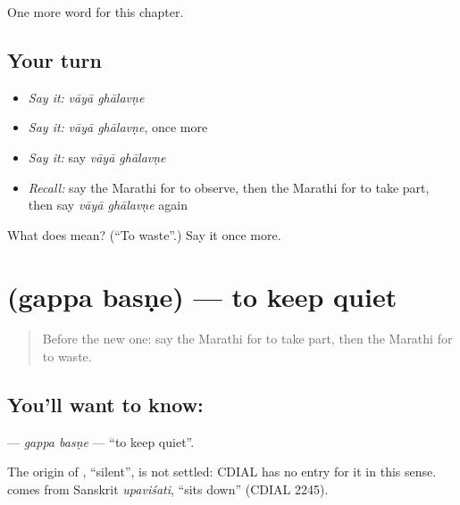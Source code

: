 \begin{grammarlens}[title={What you've built}]
One more word for this chapter.
\end{grammarlens}

\subsection*{Your turn}
\begin{itemize}
\raggedright
  \item \emph{Say it:} \emph{vāyā ghālavṇe}
  \item \emph{Say it:} \emph{vāyā ghālavṇe}, once more
  \item \emph{Say it:} say \emph{vāyā ghālavṇe}
  \item \emph{Recall:} say the Marathi for to observe, then the Marathi for to take part, then say \emph{vāyā ghālavṇe} again
\end{itemize}

\begin{tcolorbox}[breakable,colback=teal!4,colframe=teal!35!black,title={Before you move on}]
What does   mean? (\textquotedblleft{}To waste\textquotedblright{}.) Say it once more.
\end{tcolorbox}
\section[\texorpdfstring{\mr{गप्प} \mr{बसणे} (gappa basṇe)}{गप्प बसणे (gappa basṇe)}]{  (gappa basṇe) — to keep quiet}

\label{lesson:MR-C166-gappa-basne}



\begin{quote}
Before the new one: say the Marathi for to take part, then the Marathi for to waste.
\end{quote}

\subsection*{You'll want to know:  }
\textbf{ } — \emph{gappa basṇe} — \textquotedblleft{}to keep quiet\textquotedblright{}.

\begin{cousinweb}
The origin of \textbf{}, \textquotedblleft{}silent\textquotedblright{}, is not settled: CDIAL has no entry for it in this sense. \textbf{} comes from Sanskrit \emph{upaviśati}, \textquotedblleft{}sits down\textquotedblright{} (CDIAL 2245).
\end{cousinweb}

